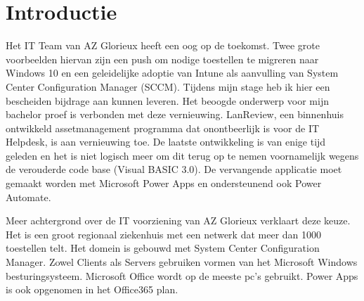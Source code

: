 
\section{Introductie} %
\label{sec:introductie}

Het IT Team van AZ Glorieux heeft een oog op de toekomst. Twee grote voorbeelden hiervan zijn een push om nodige toestellen te migreren naar Windows 10 en een geleidelijke adoptie van Intune als aanvulling van System Center Configuration Manager (SCCM). Tijdens mijn stage heb ik hier een bescheiden bijdrage aan kunnen leveren. Het beoogde onderwerp voor mijn bachelor proef is verbonden met deze vernieuwing. LanReview, een binnenhuis ontwikkeld assetmanagement programma dat onontbeerlijk is voor de IT Helpdesk, is aan vernieuwing toe. De laatste ontwikkeling is van enige tijd geleden en het is niet logisch meer om dit terug op te nemen voornamelijk wegens de verouderde code base (Visual BASIC 3.0). De vervangende applicatie moet gemaakt worden met Microsoft Power Apps en ondersteunend ook Power Automate.

Meer achtergrond over de IT voorziening van AZ Glorieux verklaart deze keuze. Het is een groot regionaal ziekenhuis met een netwerk dat meer dan 1000 toestellen telt. Het domein is gebouwd met System Center Configuration Manager. Zowel Clients als Servers gebruiken vormen van het Microsoft Windows besturingsysteem. Microsoft Office wordt op de meeste pc's gebruikt. Power Apps is ook opgenomen in het Office365 plan.

\vspace{5mm}

